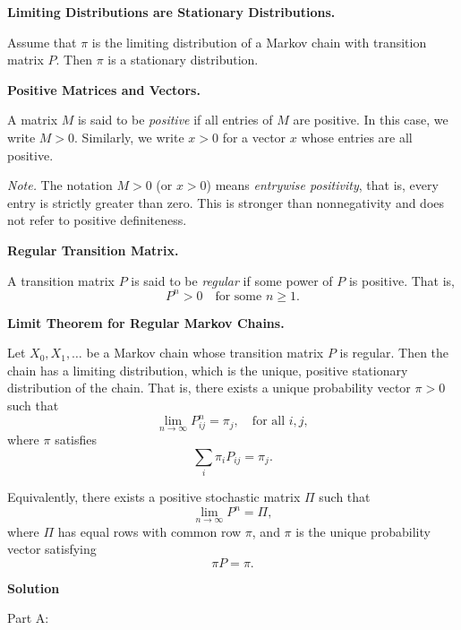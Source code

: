 \documentclass[hidelinks]{article}
\begin{document}
\medskip

{\color{darkgreen}
\noindent \textbf{Limiting Distributions are Stationary Distributions.}

\noindent Assume that $\pi$ is the limiting distribution of a Markov chain with
transition matrix $P$. Then $\pi$ is a stationary distribution.
}

\medskip

{\color{darkgreen}
\noindent \textbf{Positive Matrices and Vectors.}

\noindent A matrix $M$ is said to be \emph{positive} if all entries of $M$ are positive.
In this case, we write $M>0$. Similarly, we write $x>0$ for a vector $x$ whose entries
are all positive.

\smallskip

\noindent \emph{Note.} The notation $M>0$ (or $x>0$) means \emph{entrywise positivity},
that is, every entry is strictly greater than zero. This is stronger than
nonnegativity and does not refer to positive definiteness.
}

\medskip

{\color{darkgreen}
\noindent \textbf{Regular Transition Matrix.}

\noindent A transition matrix $P$ is said to be \emph{regular} if some power of $P$
is positive. That is,
\[
P^n > 0 \quad \text{for some } n \ge 1.
\]
}

\medskip

{\color{darkgreen}
\noindent \textbf{Limit Theorem for Regular Markov Chains.}

\noindent Let $X_0, X_1, \ldots$ be a Markov chain whose transition matrix $P$ is regular.
Then the chain has a limiting distribution, which is the unique, positive
stationary distribution of the chain. That is, there exists a unique probability
vector $\pi>0$ such that
\[
\lim_{n\to\infty} P^n_{ij} = \pi_j,
\quad \text{for all } i,j,
\]
where $\pi$ satisfies
\[
\sum_i \pi_i P_{ij} = \pi_j.
\]

\smallskip

\noindent Equivalently, there exists a positive stochastic matrix $\Pi$ such that
\[
\lim_{n\to\infty} P^n = \Pi,
\]
where $\Pi$ has equal rows with common row $\pi$, and $\pi$ is the unique
probability vector satisfying
\[
\pi P = \pi.
\]
}

\noindent \textbf{Solution}

\smallskip

\noindent Part A:

\smallskip
\end{document}
